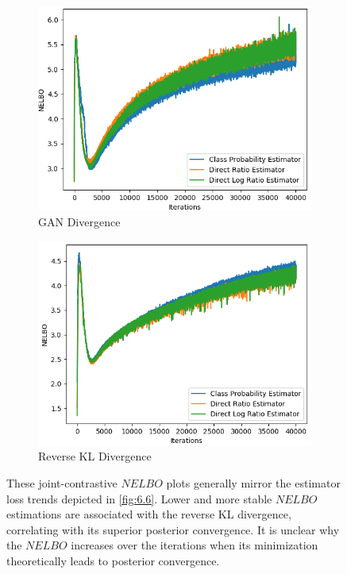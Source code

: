 \documentclass[honours,12pt, twoside]{unswthesis}
\numberwithin{equation}{section}
\theoremstyle{definition}
\begin{document}
\begin{figure}
\begin{subfigure}{0.49\textwidth}
\includegraphics[width=\linewidth]{nelbos/JCADVvsJCADVexpvsJCADVgudlog.png}
\caption{GAN Divergence}
\end{subfigure}
\begin{subfigure}{0.49\textwidth}
\includegraphics[width=\linewidth]{nelbos/JCKLDvsJCKLexpvsJCKLgudlog.png}
\caption{Reverse KL Divergence}
\end{subfigure}
\caption{\small These joint-contrastive $NELBO$ plots generally mirror the estimator loss trends depicted in \autoref{fig:6.6}. Lower and more stable $NELBO$ estimations are associated with the reverse KL divergence, correlating with its superior posterior convergence. It is unclear why the $NELBO$ increases over the iterations when its minimization theoretically leads to posterior convergence.}
\label{fig:6.7}
\end{figure}
\end{document}
